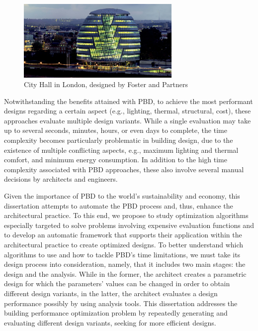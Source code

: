 	\begin{figure}[htbp]
		\centering
		\includegraphics[width=0.70\textwidth]{./Images/Introduction/cityhalllondon.jpg}
		\caption{City Hall in London, designed by Foster and Partners}
		\label{fig:cityhalllondon}
	\end{figure}

	Notwithstanding the benefits attained with \ac{PBD}, to achieve the most performant designs regarding a certain aspect (e.g., lighting, thermal, structural, cost), these approaches evaluate multiple design variants. While a single evaluation may take up to several seconds, minutes, hours, or even days to complete, the time complexity becomes particularly problematic in building design, due to the existence of multiple conflicting aspects, e.g., maximum lighting and thermal comfort, and minimum energy consumption. In addition to the high time complexity associated with \ac{PBD} approaches, these also involve several manual decisions by architects and engineers.
		
	Given the importance of \ac{PBD} to the world's sustainability and economy, this dissertation  attempts to automate the \ac{PBD} process and, thus, enhance the architectural practice. To this end, we propose to study optimization algorithms especially targeted to solve problems involving expensive evaluation functions and to develop an automatic framework that supports their application within the architectural practice to create optimized designs. To better understand which algorithms to use and how to tackle \ac{PBD}'s time limitations, we must take its design process into consideration, namely, that it includes two main stages: the design and the analysis. While in the former, the architect creates a parametric design for which the parameters' values can be changed in order to obtain different design variants, in the latter, the architect evaluates a design performance possibly by using analysis tools. This dissertation addresses the building performance optimization problem by repeatedly generating and evaluating different design variants, seeking for more efficient designs.
	
